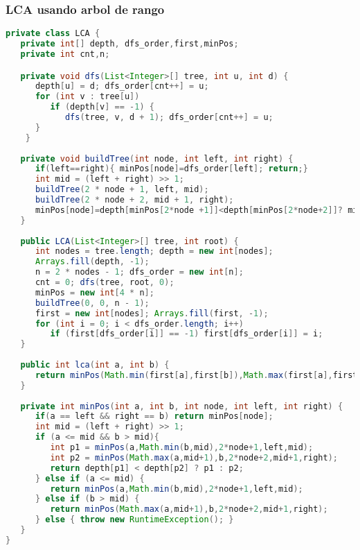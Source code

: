 \subsubsection{LCA usando arbol de rango}
\begin{lstlisting}[language=Java]
private class LCA {
   private int[] depth, dfs_order,first,minPos;
   private int cnt,n;

   private void dfs(List<Integer>[] tree, int u, int d) {
      depth[u] = d; dfs_order[cnt++] = u;
      for (int v : tree[u])
         if (depth[v] == -1) {
            dfs(tree, v, d + 1); dfs_order[cnt++] = u;
      }
    }
	
   private void buildTree(int node, int left, int right) {
      if(left==right){ minPos[node]=dfs_order[left]; return;}
      int mid = (left + right) >> 1;
      buildTree(2 * node + 1, left, mid);
      buildTree(2 * node + 2, mid + 1, right);
      minPos[node]=depth[minPos[2*node +1]]<depth[minPos[2*node+2]]? minPos[2*node+1]:minPos[2*node+2];
   }
	
   public LCA(List<Integer>[] tree, int root) {
      int nodes = tree.length; depth = new int[nodes];
      Arrays.fill(depth, -1);
      n = 2 * nodes - 1; dfs_order = new int[n];
      cnt = 0; dfs(tree, root, 0);
      minPos = new int[4 * n];
      buildTree(0, 0, n - 1);
      first = new int[nodes]; Arrays.fill(first, -1);
      for (int i = 0; i < dfs_order.length; i++)
         if (first[dfs_order[i]] == -1) first[dfs_order[i]] = i;
   }
	
   public int lca(int a, int b) {
      return minPos(Math.min(first[a],first[b]),Math.max(first[a],first[b]),0,0,n-1);
   }
	
   private int minPos(int a, int b, int node, int left, int right) {
      if(a == left && right == b) return minPos[node];
      int mid = (left + right) >> 1;
      if (a <= mid && b > mid){ 
         int p1 = minPos(a,Math.min(b,mid),2*node+1,left,mid);
         int p2 = minPos(Math.max(a,mid+1),b,2*node+2,mid+1,right);
         return depth[p1] < depth[p2] ? p1 : p2;
      } else if (a <= mid) {
         return minPos(a,Math.min(b,mid),2*node+1,left,mid);
      } else if (b > mid) {
         return minPos(Math.max(a,mid+1),b,2*node+2,mid+1,right);
      } else { throw new RuntimeException(); }
   }
}
\end{lstlisting}